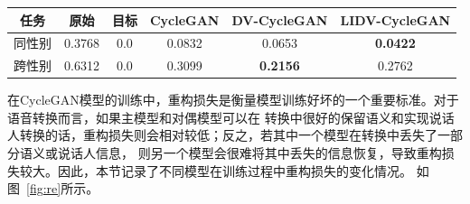 \begin{table}
    \centering
    \begin{tabular}[t]{ cccccc }
        \toprule
        任务  & 原始 & 目标 & CycleGAN & DV-CycleGAN & LIDV-CycleGAN  \\
        \midrule
        同性别    &     0.3768 & 0.0 & 0.0832 & 0.0653 & \textbf{0.0422}           \\
        跨性别    &    0.6312 & 0.0 & 0.3099 & \textbf{0.2156} & 0.2762  \\
        \bottomrule
        \end{tabular} 
    \label{tab:cosine}
\end{table}


在CycleGAN模型的训练中，重构损失是衡量模型训练好坏的一个重要标准。对于语音转换而言，如果主模型和对偶模型可以在
转换中很好的保留语义和实现说话人转换的话，重构损失则会相对较低；反之，若其中一个模型在转换中丢失了一部分语义或说话人信息，
则另一个模型会很难将其中丢失的信息恢复，导致重构损失较大。因此，本节记录了不同模型在训练过程中重构损失的变化情况。
如图~\ref{fig:re}所示。

